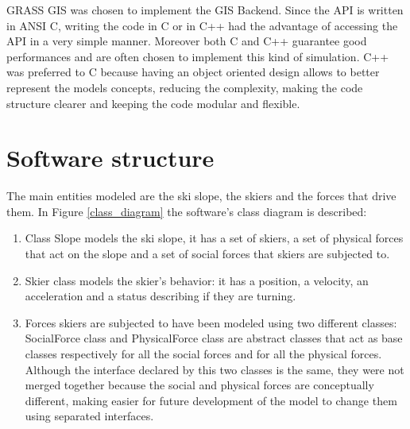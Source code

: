 \documentclass[12pt,a4paper,twoside]{book}
\begin{document}
GRASS GIS was chosen to implement the GIS Backend. Since the API is written in ANSI C, writing the code in C or in C++ had the advantage of accessing the API in a very simple manner. Moreover both C and C++ guarantee good performances and are often chosen to implement this kind of simulation. C++ was preferred to C because having an object oriented design allows to better represent the models concepts, reducing the complexity, making the code structure clearer and keeping the code modular and flexible.

\section{Software structure}
The main entities modeled are the ski slope, the skiers and the forces that drive them. In Figure \ref{class_diagram} the software's class diagram is described:
\begin{enumerate}
\item Class Slope models the ski slope, it has a set of skiers, a set of physical forces that act on the slope and a set of social forces that skiers are subjected to.
\item Skier class models the skier's behavior: it has a position, a velocity, an acceleration and a status describing if they are turning.
\item Forces skiers are subjected to have been modeled using two different classes: SocialForce class and PhysicalForce class are abstract classes that act as base classes respectively for all the social forces and for all the physical forces. Although the interface declared by this two classes is the same, they were not merged together because the social and physical forces are conceptually different, making easier for future development of the model to change them using separated interfaces.
\end{enumerate}
\end{document}
